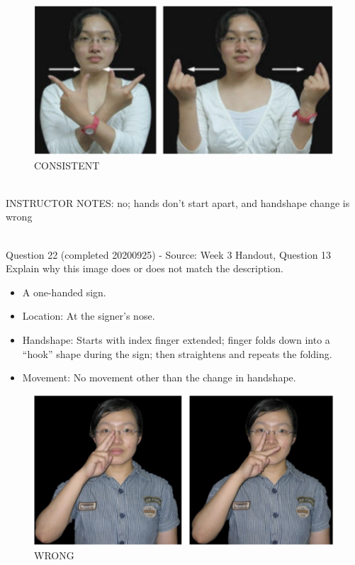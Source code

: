 \documentclass[12pt]{article}
\begin{document}
\begin{figure}[H]
\includegraphics{../images/taiwansign_consistent.png}
\caption{CONSISTENT}
\end{figure}

~\\
INSTRUCTOR NOTES: no; hands don't start apart, and handshape change is wrong


~\\

{\large Question 22} (completed 20200925) - Source: Week 3 Handout, Question 13\\

Explain why this image does or does not match the description.\\

\begin{itemize} \item A one-handed sign. \item Location: At the signer’s nose. \item Handshape: Starts with index finger extended; finger folds down into a “hook” shape during the sign; then straightens and repeats the folding. \item Movement: No movement other than the change in handshape. \end{itemize}

\begin{figure}[H]
\includegraphics{../images/taiwansign_wrong.png}
\caption{WRONG}
\end{figure}
\end{document}
